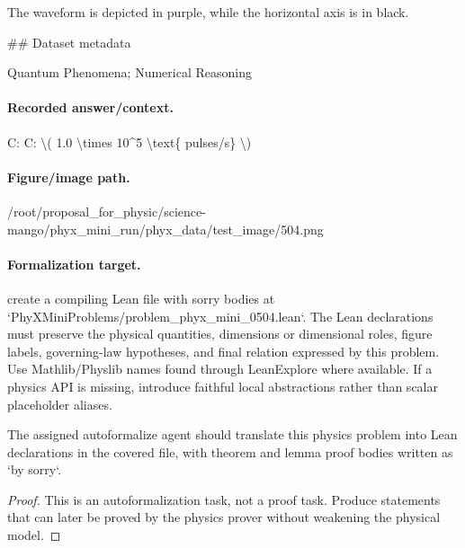 The waveform is depicted in purple, while the horizontal axis is in black.

\#\# Dataset metadata

Quantum Phenomena; Numerical Reasoning

\paragraph{Recorded answer/context.}
C: C: \textbackslash{}( 1.0 \textbackslash{}times 10\textasciicircum{}5 \textbackslash{}text\{ pulses/s\} \textbackslash{})

\paragraph{Figure/image path.}
/root/proposal\_for\_physic/science-mango/phyx\_mini\_run/phyx\_data/test\_image/504.png

\paragraph{Formalization target.}
create a compiling Lean file with sorry bodies at `PhyXMiniProblems/problem\_phyx\_mini\_0504.lean`. The Lean declarations must preserve the physical quantities, dimensions or dimensional roles, figure labels, governing-law hypotheses, and final relation expressed by this problem.
Use Mathlib/Physlib names found through LeanExplore where available. If a physics API is missing, introduce faithful local abstractions rather than scalar placeholder aliases.

\begin{theorem}
\label{thm:physics:phyx_mini_0504:target}
The assigned autoformalize agent should translate this physics problem into Lean declarations in the covered file, with theorem and lemma proof bodies written as `by sorry`.
\end{theorem}
\begin{proof}
This is an autoformalization task, not a proof task. Produce statements that can later be proved by the physics prover without weakening the physical model.
\end{proof}

